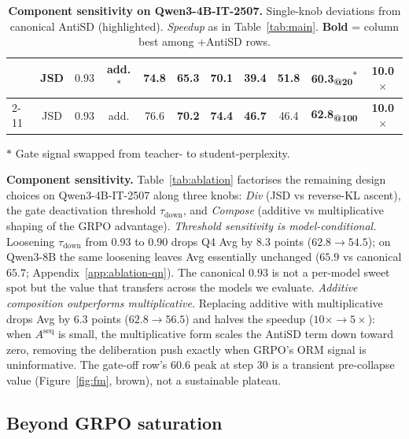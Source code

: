 \documentclass{llmxive}
\begin{document}
\begin{table}[ht]
\begin{tabular}{l|ccc|cccccc|c}
                             & JSD          & $0.93$                              & add.\textsuperscript{$\ast$} & 74.8            & 65.3            & 70.1            & 39.4            & \textbf{51.8}    & 60.3\textsubscript{@20}\textsuperscript{$\ast$} & \textbf{10.0$\times$} \\
    \cmidrule{2-11}
    \rowcolor{antisdrow}{}   & {JSD}        & {0.93}                              & {add.}                       & 76.6            & \textbf{70.2}   & \textbf{74.4}   & \textbf{46.7}   & 46.4             & \textbf{62.8\textsubscript{@100}}               & \textbf{10.0$\times$} \\
    \bottomrule
  \end{tabular}
  \par\smallskip
  {\footnotesize $\ast$ Gate signal swapped from teacher- to student-perplexity.}
  \vspace{-.5em}
\caption{\textbf{Component sensitivity on Qwen3-4B-IT-2507.} Single-knob deviations from canonical AntiSD (highlighted). \emph{Speedup} as in Table~\ref{tab:main}. \textbf{Bold} = column best among +AntiSD rows.}
\end{table}


\textbf{Component sensitivity.} Table~\ref{tab:ablation} factorises the remaining design choices on Qwen3-4B-IT-2507 along three knobs: \emph{Div} (JSD vs reverse-KL ascent), the gate deactivation threshold $\tau_{\mathrm{down}}$, and \emph{Compose} (additive vs multiplicative shaping of the GRPO advantage). \emph{Threshold sensitivity is model-conditional.} Loosening $\tau_{\mathrm{down}}$ from $0.93$ to $0.90$ drops Q4 Avg by $8.3$ points ($62.8 \to 54.5$); on Qwen3-8B the same loosening leaves Avg essentially unchanged ($65.9$ vs canonical $65.7$; Appendix~\ref{app:ablation-qn}). The canonical $0.93$ is not a per-model sweet spot but the value that transfers across the models we evaluate. \emph{Additive composition outperforms multiplicative.} Replacing additive with multiplicative drops Avg by $6.3$ points ($62.8 \to 56.5$) and halves the speedup ($10\times \to 5\times$): when $A^{\mathrm{seq}}$ is small, the multiplicative form scales the AntiSD term down toward zero, removing the deliberation push exactly when GRPO's ORM signal is uninformative. The gate-off row's $60.6$ peak at step $30$ is a transient pre-collapse value (Figure~\ref{fig:fm}, brown), not a sustainable plateau.

\subsection{Beyond GRPO saturation}
\label{sec:exp:continual}
\vspace{-0.5em}
\end{document}
